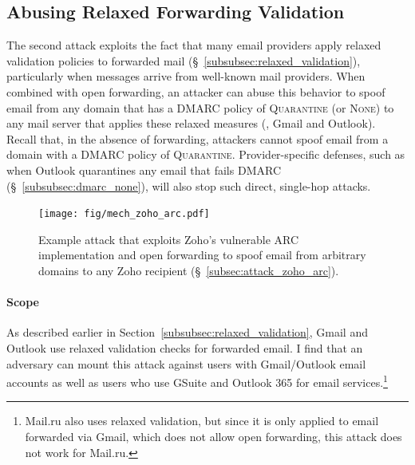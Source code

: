 \subsection{Abusing Relaxed Forwarding Validation}
\label{subsec:attack_relaxed_forwarding_validation}

The second attack exploits the fact that many email providers apply relaxed validation policies to forwarded mail (\S~\ref{subsubsec:relaxed_validation}), particularly when messages arrive from well-known mail providers.
When combined with open forwarding, an attacker can abuse this behavior
to spoof email from any domain that has a DMARC policy of
\textsc{Quarantine} (or \textsc{None}) to any mail server that applies these relaxed measures (\eg, Gmail and Outlook).  Recall that, in the absence of forwarding, attackers cannot spoof email from a domain with a DMARC policy of \textsc{Quarantine}.
Provider-specific defenses, such as when Outlook quarantines any email that fails DMARC (\S~\ref{subsubsec:dmarc_none}), will also stop such direct, single-hop attacks.

\begin{figure}[t]
\centerline{\texttt{[image: fig/mech\_zoho\_arc.pdf]}}
\centering
\caption[Example Attack Exploiting Zoho's Vulnerable ARC Implementation]{Example attack that exploits Zoho's
vulnerable ARC implementation and  open forwarding to
  spoof email from arbitrary domains to any Zoho recipient (\S~\ref{subsec:attack_zoho_arc}).}
\label{fig:mech_zoho_arc}
\end{figure}

\paragraph{Scope}
As described earlier in Section~\ref{subsubsec:relaxed_validation}, Gmail and Outlook use relaxed validation checks for forwarded email.
I find that an adversary can mount this attack against users with
Gmail/Outlook email accounts as well as users who use GSuite and Outlook 365 for email services.\footnote{Mail.ru also uses relaxed validation, but since it is only applied to email forwarded via Gmail, which does not allow open forwarding, this attack does not work for Mail.ru.}

